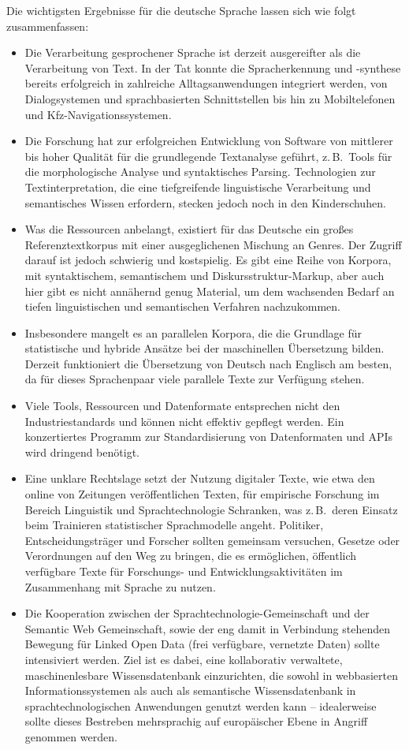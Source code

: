 \documentclass[]{../../metanetpaper}
\begin{document}
\begin{multicols}{2}
Die wichtigsten Ergebnisse für die deutsche Sprache lassen sich wie folgt zusammenfassen:

\begin{itemize}
\item Die Verarbeitung gesprochener Sprache ist derzeit ausgereifter als die Verarbeitung von Text. In der Tat konnte die Spracherkennung und -synthese bereits erfolgreich in zahlreiche Alltagsanwendungen integriert werden, von Dialogsystemen und sprachbasierten Schnittstellen bis hin zu Mobiltelefonen und Kfz-Navigationssystemen.
\item Die Forschung hat zur erfolgreichen Entwicklung von Software von mittlerer bis hoher Qualität für die grundlegende Textanalyse geführt, z.\,B.~Tools für die morphologische Analyse und syntaktisches Parsing. Technologien zur Textinterpretation, die eine tiefgreifende linguistische Verarbeitung und semantisches Wissen erfordern, stecken jedoch noch in den Kinderschuhen.
\item Was die Ressourcen anbelangt, existiert für das Deutsche ein großes Referenztextkorpus mit einer ausgeglichenen Mischung an Genres. Der Zugriff darauf ist jedoch schwierig und kostspielig. Es gibt eine Reihe von Korpora, mit syntaktischem, semantischem und Diskursstruktur-Markup, aber auch hier gibt es nicht annähernd genug Material, um dem wachsenden Bedarf an tiefen linguistischen und semantischen Verfahren nachzukommen.
\item Insbesondere mangelt es an parallelen Korpora, die die Grundlage für statistische und hybride Ansätze bei der maschinellen Übersetzung bilden. Derzeit funktioniert die Übersetzung von Deutsch nach Englisch am besten, da für dieses Sprachenpaar viele parallele Texte zur Verfügung stehen.
\item Viele Tools, Ressourcen und Datenformate entsprechen nicht den Industriestandards und können nicht effektiv gepflegt werden. Ein konzertiertes Programm zur Standardisierung von Datenformaten und APIs wird dringend benötigt.
\item Eine unklare Rechtslage setzt der Nutzung digitaler Texte, wie etwa den online von Zeitungen veröffentlichen Texten, für empirische Forschung im Bereich Linguistik und Sprachtechnologie Schranken, was z.\,B.~deren Einsatz beim Trainieren statistischer Sprachmodelle angeht. Politiker, Entscheidungsträger und Forscher sollten gemeinsam versuchen, Gesetze oder Verordnungen auf den Weg zu bringen, die es ermöglichen, öffentlich verfügbare Texte für Forschungs- und Entwicklungsaktivitäten im Zusammenhang mit Sprache zu nutzen.
\item Die Kooperation zwischen der Sprach\-tech\-no\-lo\-gie-Ge\-mein\-schaft und der Semantic Web Gemeinschaft, sowie der eng damit in Verbindung stehenden Bewegung für Linked Open Data (frei verfügbare, vernetzte Daten) sollte intensiviert werden. Ziel ist es dabei, eine kollaborativ verwaltete, maschinenlesbare Wissensdatenbank einzurichten, die sowohl in webbasierten Informationssystemen als auch als semantische Wissensdatenbank in sprachtechnologischen Anwendungen genutzt werden kann -- idealerweise sollte dieses Bestreben mehrsprachig auf europäischer Ebene in Angriff genommen werden.	
\end{itemize}


\end{multicols}
\end{document}
